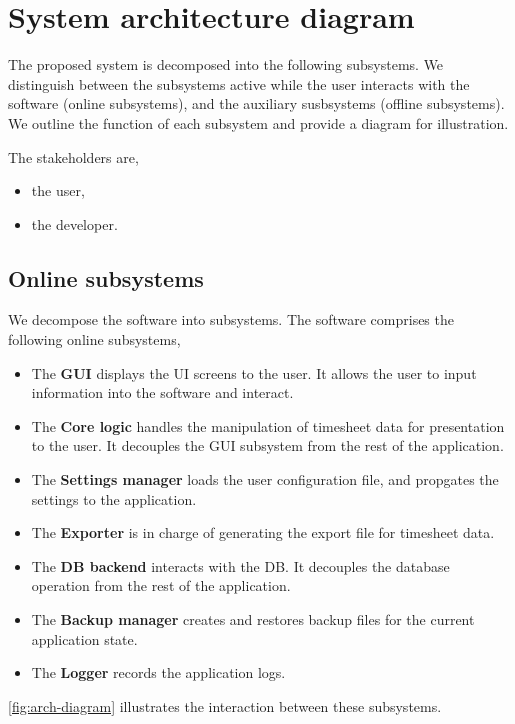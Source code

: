 \section{System architecture diagram}
The proposed system is decomposed into the following subsystems. We distinguish
between the subsystems active while the user interacts with the software (online
subsystems), and the auxiliary susbsystems (offline subsystems). We outline
the function of each subsystem and provide a diagram for illustration.

The stakeholders are,
\begin{itemize}
\item the user,
\item the developer.
\end{itemize}

\subsection{Online subsystems}
We decompose the software into subsystems.
The software comprises the following online subsystems,
\begin{itemize}
\item The \textbf{\gls{GUI}} displays the \gls{UI} screens to the user. It
  allows the user to input information into the software and interact.
\item The \textbf{Core logic} handles the manipulation of timesheet data for
  presentation to the user. It decouples the GUI subsystem from the rest
  of the application.
\item The \textbf{Settings manager} loads the user configuration file, and
  propgates the settings to the application.
\item The \textbf{Exporter} is in charge of generating the export file
  for timesheet data.
\item The \textbf{\gls{DB} backend} interacts with the \gls{DB}. It decouples
  the database operation from the rest of the application.
\item The \textbf{Backup manager} creates and restores backup files for the
  current application state.
\item The \textbf{Logger} records the application logs.
\end{itemize}

\cref{fig:arch-diagram} illustrates the interaction between these
subsystems.

